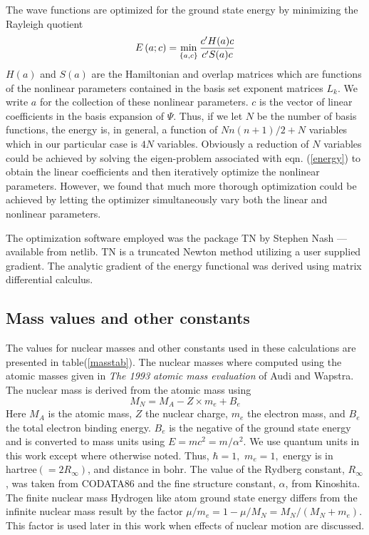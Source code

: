 \documentclass[12pt,thmsa]{article}
\begin{document}
The wave functions are optimized for the ground state energy by minimizing
the Rayleigh quotient 
\begin{equation}
E\left( a;c\right) =\min_{\left\{ a,c\right\} }\frac{c^{\prime }H(a)c}{%
c^{\prime }S(a)c}  \label{energy}
\end{equation}
$H\left( a\right) $ and $S\left( a\right) $ are the Hamiltonian and overlap
matrices which are functions of the nonlinear parameters contained in the
basis set exponent matrices $L_k$. We write $a$ for the collection of these
nonlinear parameters. $c$ is the vector of linear coefficients in the basis
expansion of $\Psi .$ Thus, if we let $N$ be the number of basis functions,
the energy is, in general, a function of $Nn\left( n+1\right) /2+N$
variables which in our particular case is $4N$ variables. Obviously a
reduction of $N$ variables could be achieved by solving the eigen-problem
associated with eqn. (\ref{energy}) to obtain the linear coefficients and
then iteratively optimize the nonlinear parameters. However, we found that
much more thorough optimization could be achieved by letting the optimizer
simultaneously vary both the linear and nonlinear parameters.

The optimization software employed was the package TN by Stephen Nash\cite
{NashTN} --- available from netlib\cite{netlib}. TN is a truncated Newton
method utilizing a user supplied gradient. The analytic gradient of the
energy functional was derived using matrix differential calculus\cite
{Kinghorn95a,Kinghorn95b}.

\subsection{Mass values and other constants}

The values for nuclear masses and other constants used in these calculations
are presented in table(\ref{masstab}). The nuclear masses where computed
using the atomic masses given in \emph{The 1993 atomic mass evaluation} of
Audi and Wapstra\cite{Audi93}. The nuclear mass is derived from the atomic
mass using 
\begin{equation}
M_N=M_A-Z\times m_e+B_e
\end{equation}
Here $M_A$ is the atomic mass, $Z$ the nuclear charge, $m_e$ the electron
mass, and $B_e$ the total electron binding energy. $B_e$ is the negative of
the ground state energy and is converted to mass units using $%
E=mc^2=m/\alpha ^2.$ We use quantum units in this work except where
otherwise noted. Thus, $\hbar =1,$ $m_e=1,$ energy is in hartree$\left(
=2R_\infty \right) $, and distance in bohr. The value of the Rydberg
constant, $R_\infty $, was taken from CODATA86\cite{codata86} and the fine
structure constant, $\alpha $, from Kinoshita\cite{Kinoshita95}. The finite
nuclear mass Hydrogen like atom ground state energy differs from the
infinite nuclear mass result by the factor $\mu /m_e=1-\mu /M_N=M_N/\left(
M_N+m_e\right) .$ This factor is used later in this work when effects of
nuclear motion are discussed.
\end{document}
